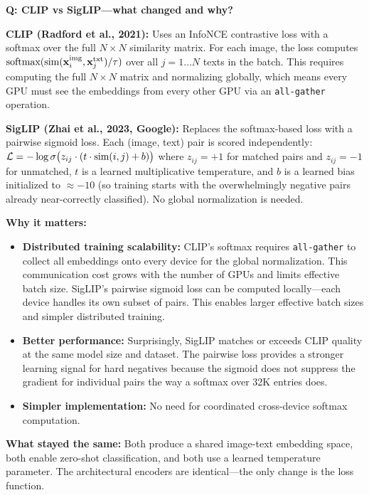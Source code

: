 \begin{interviewq}
\textbf{Q: CLIP vs SigLIP---what changed and why?}

 \quad {} \quad \badgefreq{\freqmed}

\stronganswer

\textbf{CLIP (Radford et al., 2021):} Uses an InfoNCE contrastive loss with a softmax over the full $N \times N$ similarity matrix. For each image, the loss computes $\text{softmax}(\text{sim}(\mathbf{x}_i^{\text{img}}, \mathbf{x}_j^{\text{txt}}) / \tau)$ over all $j = 1 \ldots N$ texts in the batch. This requires computing the full $N \times N$ matrix and normalizing globally, which means every GPU must see the embeddings from every other GPU via an \texttt{all-gather} operation.

\textbf{SigLIP (Zhai et al., 2023, Google):} Replaces the softmax-based loss with a pairwise sigmoid loss. Each (image, text) pair is scored independently: $\mathcal{L} = -\log\sigma\big(z_{ij} \cdot (t \cdot \text{sim}(i,j) + b)\big)$ where $z_{ij} = +1$ for matched pairs and $z_{ij} = -1$ for unmatched, $t$ is a learned multiplicative temperature, and $b$ is a learned bias initialized to $\approx -10$ (so training starts with the overwhelmingly negative pairs already near-correctly classified). No global normalization is needed.

\textbf{Why it matters:}
\begin{itemize}
    \item \textbf{Distributed training scalability:} CLIP's softmax requires \texttt{all-gather} to collect all embeddings onto every device for the global normalization. This communication cost grows with the number of GPUs and limits effective batch size. SigLIP's pairwise sigmoid loss can be computed locally---each device handles its own subset of pairs. This enables larger effective batch sizes and simpler distributed training.
    \item \textbf{Better performance:} Surprisingly, SigLIP matches or exceeds CLIP quality at the same model size and dataset. The pairwise loss provides a stronger learning signal for hard negatives because the sigmoid does not suppress the gradient for individual pairs the way a softmax over 32K entries does.
    \item \textbf{Simpler implementation:} No need for coordinated cross-device softmax computation.
\end{itemize}

\textbf{What stayed the same:} Both produce a shared image-text embedding space, both enable zero-shot classification, and both use a learned temperature parameter. The architectural encoders are identical---the only change is the loss function.


\end{interviewq}

